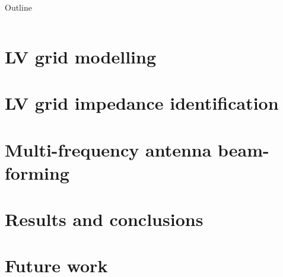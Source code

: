 \documentclass[11pt, aspectratio=169]{beamer}
\theoremstyle{plain}
\begin{document}
\begin{frame}[t]{Outline}
\begin{columns}[T]
\begin{column}{0.5\textwidth}


\end{column}
\end{columns}

\end{frame}

\section{LV grid modelling}



\section{LV grid impedance identification}



\section{Multi-frequency antenna beam-forming}



\section{Results and conclusions}



\section{Future work}
\end{document}
